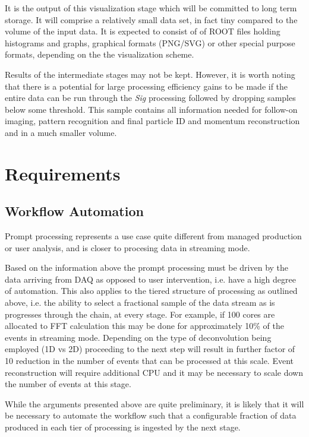 \documentclass[pdftex,12pt,letter]{article}
\begin{document}
\noindent It is the output of this visualization stage which will be
committed to long term storage.  It will comprise a relatively small
data set, in fact tiny compared to the volume of the input data.  It is expected
to consist of of ROOT files holding histograms and graphs, graphical formats (PNG/SVG)
or other special purpose formats, depending on the the visualization scheme.

Results of the intermediate stages may not be kept.  However, it is
worth noting that there is a potential for large processing efficiency
gains to be made if the entire data can be run through the
\textit{Sig} processing followed by dropping samples below some
threshold.  This sample contains all information needed for follow-on
imaging, pattern recognition and final particle ID and momentum
reconstruction and in a much smaller volume.

\section{Requirements}

\subsection{Workflow Automation}

Prompt processing represents a use case quite different from managed production or user analysis, and is closer to
procesing data in streaming mode.

Based on the information above the prompt processing must be driven by the data arriving from DAQ as opposed
to user intervention, i.e. have a high degree of automation. This also applies to the tiered structure of processing as outlined above,
i.e. the ability to select a fractional sample of the data stream as is progresses through the chain, at every stage.
For example, if 100 cores are allocated to FFT calculation this may be done for approximately 10\% of the events
in streaming mode. Depending on the type of deconvolution being employed (1D vs 2D) proceeding to the next
step will result in further factor of 10 reduction in the number of events that can be processed at this scale.
Event reconstruction will require additional CPU and it may be necessary to scale down the number of
events at this stage.

While the arguments presented above are quite preliminary, it is likely that it will be necessary to automate
the workflow such that a configurable fraction of data produced in each tier of processing is ingested by the next stage.
\end{document}
